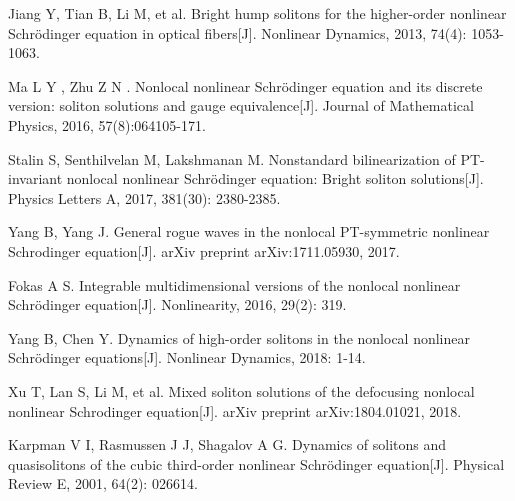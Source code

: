 \begin{thebibliography}{0}
Jiang Y, Tian B, Li M, et al. Bright hump solitons for the higher-order nonlinear Schrödinger equation in optical fibers[J]. Nonlinear Dynamics, 2013, 74(4): 1053-1063.

Ma L Y , Zhu Z N . Nonlocal nonlinear Schr\"odinger equation and its discrete version: soliton solutions and gauge equivalence[J]. Journal of Mathematical Physics, 2016, 57(8):064105-171.

Stalin S, Senthilvelan M, Lakshmanan M. Nonstandard bilinearization of PT-invariant nonlocal nonlinear Schrödinger equation: Bright soliton solutions[J]. Physics Letters A, 2017, 381(30): 2380-2385.

Yang B, Yang J. General rogue waves in the nonlocal PT-symmetric nonlinear Schrodinger equation[J]. arXiv preprint arXiv:1711.05930, 2017.

Fokas A S. Integrable multidimensional versions of the nonlocal nonlinear Schrödinger equation[J]. Nonlinearity, 2016, 29(2): 319.

Yang B, Chen Y. Dynamics of high-order solitons in the nonlocal nonlinear Schrödinger equations[J]. Nonlinear Dynamics, 2018: 1-14.

Xu T, Lan S, Li M, et al. Mixed soliton solutions of the defocusing nonlocal nonlinear Schrodinger equation[J]. arXiv preprint arXiv:1804.01021, 2018.

Karpman V I, Rasmussen J J, Shagalov A G. Dynamics of solitons and quasisolitons of the cubic third-order nonlinear Schrödinger equation[J]. Physical Review E, 2001, 64(2): 026614.


\end{thebibliography}
\cleardoublepage
